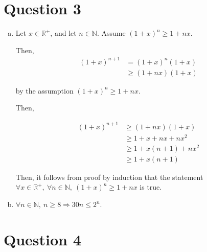 \documentclass[12pt]{article}
\begin{document}
\section*{Question 3}
\begin{enumerate}[a.]
    \item

    Let $x \in \mathbb{R}^{+}$, and let $n \in \mathbb{N}$. Assume $(1+x)^n \geq
    1 + nx$.

    \bigskip

    Then,
    \setcounter{equation}{0}
    \begin{align}
        (1+x)^{n+1} &= (1+x)^n(1+x)\\
        &\geq (1+nx)(1+x)
    \end{align}

    by the assumption $(1+x)^n \geq 1 + nx$.

    \bigskip

    Then,

    \begin{align}
        (1+x)^{n+1} &\geq (1+nx)(1+x)\\
        &\geq 1 + x + nx + nx^2\\
        &\geq 1 + x(n+1) + nx^2\\
        &\geq 1 + x(n+1)
    \end{align}

    Then, it follows from proof by induction that the statement $\forall x \in
    \mathbb{R}^{+},\:\forall n \in \mathbb{N},\:(1+x)^n \geq 1 + nx$ is true.

    \item

    $\forall n \in \mathbb{N},\:n \geq 8 \Rightarrow 30n \leq 2^n$.

\end{enumerate}

\section*{Question 4}
\end{document}
